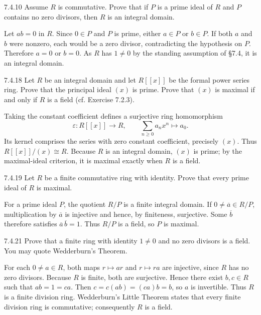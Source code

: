\documentclass[11pt,oneside]{article}
\begin{document}
\begin{exercise}{7.4.10}
Assume $R$ is commutative. Prove that if $P$ is a prime ideal of $R$ and $P$ contains no zero divisors, then $R$ is an integral domain.
\end{exercise}
\begin{solution}
Let $ab=0$ in $R$. Since $0\in P$ and $P$ is prime, either $a\in P$ or $b\in P$. If both $a$ and $b$ were nonzero, each would be a zero divisor, contradicting the hypothesis on $P$. Therefore $a=0$ or $b=0$. As $R$ has $1\ne0$ by the standing assumption of \S7.4, it is an integral domain.
\end{solution}

\begin{exercise}{7.4.18}
Let $R$ be an integral domain and let $R[[x]]$ be the formal power series ring. Prove that the principal ideal $(x)$ is prime. Prove that $(x)$ is maximal if and only if $R$ is a field (cf. Exercise 7.2.3).
\end{exercise}
\begin{solution}
Taking the constant coefficient defines a surjective ring homomorphism
\[
\varepsilon:R[[x]]\to R,\qquad \sum_{n\ge0}a_nx^n\mapsto a_0.
\]
Its kernel comprises the series with zero constant coefficient, precisely $(x)$. Thus $R[[x]]/(x)\cong R$. Because $R$ is an integral domain, $(x)$ is prime; by the maximal-ideal criterion, it is maximal exactly when $R$ is a field.
\end{solution}

\begin{exercise}{7.4.19}
Let $R$ be a finite commutative ring with identity. Prove that every prime ideal of $R$ is maximal.
\end{exercise}
\begin{solution}
For a prime ideal $P$, the quotient $R/P$ is a finite integral domain. If $0\ne\overline a\in R/P$, multiplication by $\overline a$ is injective and hence, by finiteness, surjective. Some $\overline b$ therefore satisfies $\overline a\,\overline b=1$. Thus $R/P$ is a field, so $P$ is maximal.
\end{solution}

\begin{exercise}{7.4.21}
Prove that a finite ring with identity $1\ne0$ and no zero divisors is a field. You may quote Wedderburn's Theorem.
\end{exercise}
\begin{solution}
For each $0\ne a\in R$, both maps $r\mapsto ar$ and $r\mapsto ra$ are injective, since $R$ has no zero divisors. Because $R$ is finite, both are surjective. Hence there exist $b,c\in R$ such that $ab=1=ca$. Then $c=c(ab)=(ca)b=b$, so $a$ is invertible. Thus $R$ is a finite division ring. Wedderburn's Little Theorem states that every finite division ring is commutative; consequently $R$ is a field.
\end{solution}
\end{document}
